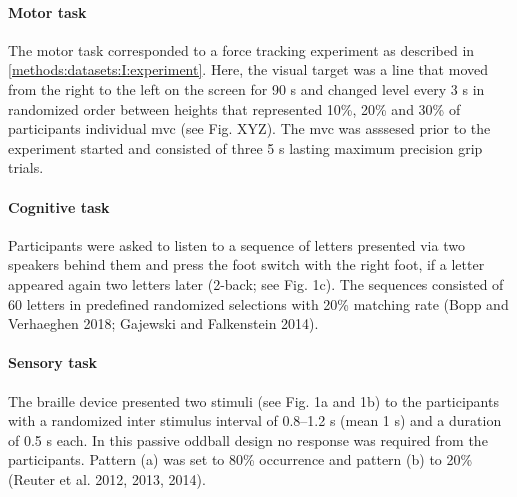 \paragraph{Motor task}
The motor task corresponded to a force tracking experiment as described in \autoref{methods:datasets:I:experiment}. Here, the visual target was a line that moved from the right to the left on the screen for 90 s and changed level every 3 s in randomized order between heights that represented 10\%, 20\% and 30\% of participants individual \gls{mvc} (see Fig. XYZ). The \gls{mvc} was asssesed prior to the experiment started and consisted of three 5 s lasting maximum precision grip trials.

\paragraph{Cognitive task}
Participants were asked to listen to a sequence of letters presented via two speakers behind them and press the foot
switch with the right foot, if a letter appeared again two letters later (2-back; see Fig. 1c). The sequences consisted of 60 letters in predefined randomized selections with 20\% matching rate (Bopp and Verhaeghen 2018; Gajewski and Falkenstein 2014).

\paragraph{Sensory task}
The braille device presented two stimuli (see Fig. 1a and 1b) to the participants with a randomized inter stimulus
interval of 0.8–1.2 s (mean 1 s) and a duration of 0.5 s each. In this passive oddball design no response was
required from the participants. Pattern (a) was set to 80\% occurrence and pattern (b) to 20\% (Reuter et al. 2012, 2013, 2014).


